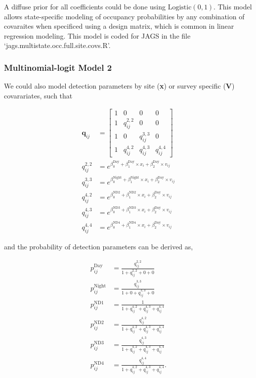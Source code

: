 \documentclass[12pt]{article}
\begin{document}
A diffuse prior for all coefficients could be done using $\text{Logistic}(0,1).$ This model allows state-specific modeling of occupancy probabilities by any combination of covaraites when specificed using a design matrix, which is common in linear regression modeling. This model is coded for JAGS in the file `jags.multistate.occ.full.site.covs.R'.

\subsubsection{Multinomial-logit Model 2}

We could also model detection parameters by site (\textbf{x}) or survey specific (\textbf{V}) covarariates, such that 
\begin{center}
\begin{align*}
\boldsymbol{q}_{ij} &= \begin{bmatrix} 1 & 0 & 0 & 0 \\ 
									1 &  q^{2,2}_{ij} & 0 & 0 \\ 
									1 & 0 & q^{3,3}_{ij} & 0\\
  								       1 & q^{4,2}_{ij} & q^{4,3}_{ij} & q^{4,4}_{ij}
  								      \end{bmatrix}\\
q^{2,2}_{ij} &=e^{\beta^{\text{Day}}_{0} +\beta^{\text{Day}}_{1}\times x_{i}+\beta^{\text{Day}}_{2}\times v_{ij}}\\
q^{3,3}_{ij} &=e^{\beta^{\text{Night}}_{0} +\beta^{\text{Night}}_{1}\times x_{i}+\beta^{\text{Day}}_{2}\times v_{ij}}\\
q^{4,2}_{ij} &=e^{\beta^{\text{ND2}}_{0} +\beta^{\text{ND2}}_{1}\times x_{i}+\beta^{\text{Day}}_{2}\times v_{ij}}\\
q^{4,3}_{ij} &=e^{\beta^{\text{ND3}}_{0} +\beta^{\text{ND3}}_{1}\times x_{i}+\beta^{\text{Day}}_{2}\times v_{ij}}\\
q^{4,4}_{ij} &=e^{\beta^{\text{ND4}}_{0} +\beta^{\text{ND4}}_{1}\times x_{i}+\beta^{\text{Day}}_{2}\times v_{ij}}
\end{align*}
\end{center}
and the probability of detection parameters can be derived as, 
\begin{center}
\begin{align*}
p^{\text{Day}}_{ij} &=\frac{q^{2,2}_{ij}}{1+q^{2,2}_{ij}+0+0}\\
p^{\text{Night}}_{ij} &=\frac{q^{3,3}_{ij}}{1+0+q^{3,3}_{ij}+0}\\
p^{\text{ND1}}_{ij} &=\frac{1}{1+q^{4,2}_{ij}+q^{4,3}_{ij}+q^{4,4}_{ij}}\\
p^{\text{ND2}}_{ij} &=\frac{q^{4,2}_{ij}}{1+q^{4,2}_{ij}+q^{4,3}_{ij}+q^{4,4}_{ij}}\\
p^{\text{ND3}}_{ij} &=\frac{q^{4,3}_{ij}}{1+q^{4,2}_{ij}+q^{4,3}_{ij}+q^{4,4}_{ij}}\\
p^{\text{ND4}}_{ij} &=\frac{q^{4,4}_{ij}}{1+q^{4,2}_{ij}+q^{4,3}_{ij}+q^{4,4}_{ij}}.
\end{align*}
\end{center}
\end{document}
